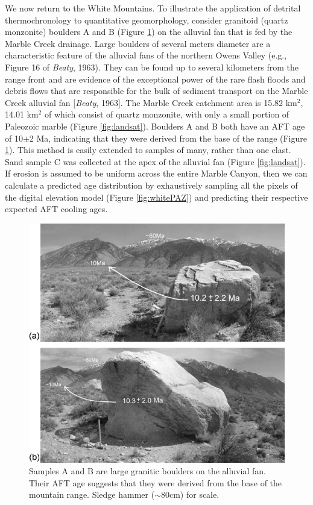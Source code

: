 \documentclass[12pt,twoside]{article}
\begin{document}
We now return  to the White Mountains.  To  illustrate the application
of detrital  thermochronology to quantitative  geomorphology, consider
granitoid    (quartz   monzonite)   boulders    A   and    B   (Figure
\ref{fig:boulders})  on the  alluvial fan  that is  fed by  the Marble
Creek  drainage.  Large  boulders  of several  meters  diameter are  a
characteristic  feature of  the alluvial  fans of  the  northern Owens
Valley (e.g., Figure  16 of {\it Beaty}, 1963).  They  can be found up
to several  kilometers from  the range front  and are evidence  of the
exceptional power of  the rare flash floods and  debris flows that are
responsible for  the bulk  of sediment transport  on the  Marble Creek
alluvial fan [{\it Beaty}, 1963].   The Marble Creek catchment area is
15.82 km$^2$, 14.01 km$^2$ of  which consist of quartz monzonite, with
only a  small portion of Paleozoic marble  (Figure \ref{fig:landsat}). 
Boulders A and B both have  an AFT age of 10$\pm$2 Ma, indicating that
they   were   derived   from   the   base   of   the   range   (Figure
\ref{fig:boulders}).   This method  is easily  extended to  samples of
many, rather than one clast.  Sand  sample C was collected at the apex
of the alluvial fan (Figure \ref{fig:landsat}).  If erosion is assumed
to be uniform across the entire Marble Canyon, then we can calculate a
predicted age distribution by  exhaustively sampling all the pixels of
the digital elevation model (Figure \ref{fig:whitePAZ}) and predicting
their respective expected AFT cooling ages.
\\

\begin{figure}[here]
  \centering
  \includegraphics[width=.667\textwidth]{fig3.jpg}
  \caption[Boulders A and B]
  {Samples A  and B are large  granitic boulders on the  alluvial fan. 
    Their AFT age suggests that they were derived from the base of the
    mountain range. Sledge hammer ($\sim$80cm) for scale.}
\label{fig:boulders}
\end{figure}
\end{document}
